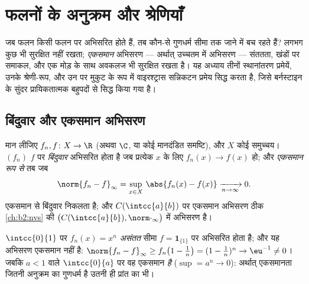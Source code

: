 \chapter{फलनों के अनुक्रम और श्रेणियाँ}\label{ch:b2:funcseq}

जब फलन किसी फलन पर अभिसरित होते हैं, तब कौन-से गुणधर्म सीमा तक जाने में
बच रहते हैं?  लगभग कुछ भी सुरक्षित नहीं रखता;
\emph{एकसमान} अभिसरण --- अर्थात् उच्चतम  में अभिसरण --- संततता,
खंडों पर समाकल, और एक मोड़ के साथ अवकलज भी सुरक्षित रखता है। यह अध्याय
तीनों स्थानांतरण प्रमेयें, उनके श्रेणी-रूप, और उन पर मुकुट के रूप में
वाइरश्ट्रास सन्निकटन प्रमेय सिद्ध करता है, जिसे बर्नस्टाइन के सुंदर
प्रायिकतात्मक बहुपदों से सिद्ध किया गया है।

\section{बिंदुवार और एकसमान अभिसरण}

\begin{definition}\label{def:b2:funcseq:def}
मान लीजिए $f_n, f \colon X \to \R$ (अथवा $\C$, या कोई मानदंडित समष्टि), और $X$ कोई समुच्चय।
$(f_n)$ $f$ पर \emph{बिंदुवार} अभिसरित होता है जब
प्रत्येक $x$ के लिए $f_n(x) \to
f(x)$ हो; और \emph{एकसमान रूप से} तब जब
\[
\norm{f_n - f}_\infty = \sup_{x \in X}\, \abs{f_n(x) - f(x)}
\xrightarrow[n \to \infty]{} 0 .
\]
एकसमान से बिंदुवार निकलता है; और $C(\intcc{a}{b})$ पर एकसमान अभिसरण ठीक \cref{ch:b2:nvs} की  $\bigl(C(\intcc{a}{b}), \norm\cdot_\infty\bigr)$ में अभिसरण है।
\end{definition}

\begin{example}\label{ex:b2:funcseq:xn}
$\intcc{0}{1}$ पर $f_n(x) = x^n$ \emph{असंतत} सीमा $f = \mathbf{1}_{\{1\}}$ पर  अभिसरित होता है; और यह
अभिसरण एकसमान नहीं है: $\norm{f_n - f}_\infty \geq f_n\bigl(1 -
\tfrac1n\bigr) = (1 - \tfrac1n)^n \to \eu^{-1} \neq 0$। जबकि $a < 1$ वाले $\intcc{0}{a}$ पर वह एकसमान \emph{है}
($\sup = a^n \to
0$): अर्थात् एकसमानता जितनी अनुक्रम का गुणधर्म है उतनी ही प्रांत का
भी।
\end{example}

